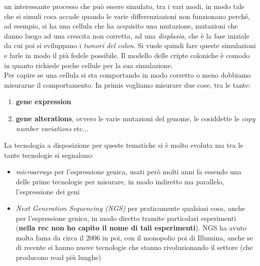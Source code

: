 \documentclass[a4paper,12pt, oneside]{book}
\begin{document}
un interessante processo che può essere simulato, tra i vari modi, in modo tale
che si simuli cosa accade quando le varie differenziazioni non funzionano
perché, ad esempio, si ha una cellula che ha acquisito una mutazione, mutazioni
che danno luogo ad una crescita non corretta, ad una \textit{displasia}, che è
la fase iniziale da cui poi si sviluppano i \textit{tumori del colon}. Si vuole
quindi fare queste simulazioni e farle in modo il più fedele possibile. Il
modello delle cripte coloniche è comodo in quanto richiede poche cellule per la
sua simulazione.\\
Per capire se una cellula si sta comportando in modo corretto o meno dobbiamo
misurarne il comportamento. In primis vogliamo misurare due cose, tra le tante:
\begin{enumerate}
  \item \textbf{gene expression}
  \item \textbf{gene alterations}, ovvero le varie mutazioni del genome, le
  cosiddette le \textit{copy number variations} etc$\ldots$
\end{enumerate}
La tecnologia a disposizione per queste tematiche si è molto evoluta ma tra le
tante tecnologie si segnalano:
\begin{itemize}
  \item \textit{microarrays} per l'espressione genica, usati però molti anni fa
  essendo una delle prime tecnologie per misurare, in modo indiretto ma
  parallelo, l'espressione dei geni
  \item \textit{Next Generation Sequencing (NGS)} per praticamente qualsiasi
  cosa, anche per l'espressione genica, in modo diretto tramite particolari
  esperimenti (\textbf{nella rec non ho capito il nome di tali
    esperimenti}). NGS ha avuto molta fama da circa il 2006 in poi, con il
  monopolio poi di Illumina, anche se di recente si hanno nuove tecnologie che
  stanno rivoluzionando il settore (che producono read più lunghe)
\end{itemize}
\end{document}
